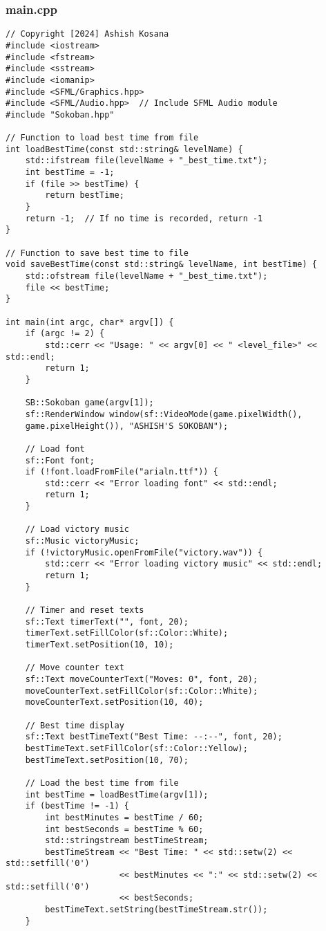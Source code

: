 \documentclass[12pt]{article}
\begin{document}
\subsubsection{main.cpp}
\begin{lstlisting}[style=cppcode]
// Copyright [2024] Ashish Kosana
#include <iostream>
#include <fstream>
#include <sstream>
#include <iomanip>
#include <SFML/Graphics.hpp>
#include <SFML/Audio.hpp>  // Include SFML Audio module
#include "Sokoban.hpp"

// Function to load best time from file
int loadBestTime(const std::string& levelName) {
    std::ifstream file(levelName + "_best_time.txt");
    int bestTime = -1;
    if (file >> bestTime) {
        return bestTime;
    }
    return -1;  // If no time is recorded, return -1
}

// Function to save best time to file
void saveBestTime(const std::string& levelName, int bestTime) {
    std::ofstream file(levelName + "_best_time.txt");
    file << bestTime;
}

int main(int argc, char* argv[]) {
    if (argc != 2) {
        std::cerr << "Usage: " << argv[0] << " <level_file>" << std::endl;
        return 1;
    }

    SB::Sokoban game(argv[1]);
    sf::RenderWindow window(sf::VideoMode(game.pixelWidth(),
    game.pixelHeight()), "ASHISH'S SOKOBAN");

    // Load font
    sf::Font font;
    if (!font.loadFromFile("arialn.ttf")) {
        std::cerr << "Error loading font" << std::endl;
        return 1;
    }

    // Load victory music
    sf::Music victoryMusic;
    if (!victoryMusic.openFromFile("victory.wav")) {
        std::cerr << "Error loading victory music" << std::endl;
        return 1;
    }

    // Timer and reset texts
    sf::Text timerText("", font, 20);
    timerText.setFillColor(sf::Color::White);
    timerText.setPosition(10, 10);

    // Move counter text
    sf::Text moveCounterText("Moves: 0", font, 20);
    moveCounterText.setFillColor(sf::Color::White);
    moveCounterText.setPosition(10, 40);

    // Best time display
    sf::Text bestTimeText("Best Time: --:--", font, 20);
    bestTimeText.setFillColor(sf::Color::Yellow);
    bestTimeText.setPosition(10, 70);

    // Load the best time from file
    int bestTime = loadBestTime(argv[1]);
    if (bestTime != -1) {
        int bestMinutes = bestTime / 60;
        int bestSeconds = bestTime % 60;
        std::stringstream bestTimeStream;
        bestTimeStream << "Best Time: " << std::setw(2) << std::setfill('0')
                       << bestMinutes << ":" << std::setw(2) << std::setfill('0')
                       << bestSeconds;
        bestTimeText.setString(bestTimeStream.str());
    }


\end{lstlisting}
\end{document}
